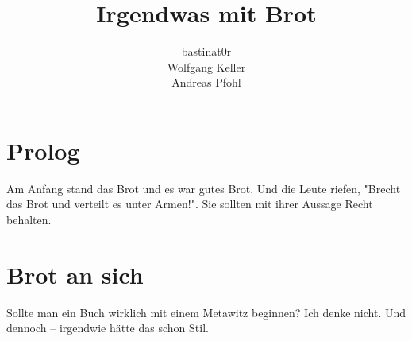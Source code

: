 \documentclass{book}
\title{Irgendwas mit Brot}
\author{bastinat0r \\ Wolfgang Keller \\ Andreas Pfohl}
\begin{document}
\maketitle

\chapter*{Prolog}
Am Anfang stand das Brot und es war gutes Brot. Und die Leute riefen,
"Brecht das Brot und verteilt es unter Armen!". Sie sollten mit ihrer Aussage
Recht behalten.

\chapter{Brot an sich}
Sollte man ein Buch wirklich mit einem Metawitz beginnen? Ich denke nicht. Und
dennoch – irgendwie hätte das schon Stil.
\end{document}

